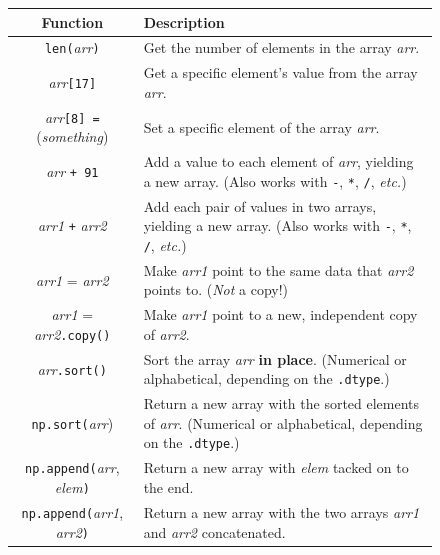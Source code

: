 \begin{figure}[ht]
\centering
\begin{tabular}{c|p{3.3in}}
Function & Description \\
\hline

\texttt{len(}\textsl{arr}\texttt{)} & Get the number of elements in the array \textsl{arr}. \\

\textsl{arr}\texttt{[17]} & Get a specific element's value from the array \textsl{arr}. \\

\textsl{arr}\texttt{[8] =} (\textsl{something}) & Set a specific element of the array \textsl{arr}. \\

\textsl{arr} \texttt{+ 91} & Add a value to each element of \textsl{arr},
yielding a new array. (Also works with \texttt{-}, \texttt{*}, \texttt{/},
\textit{etc.}) \\

\textsl{arr1} \texttt{+} \textsl{arr2} & Add each pair of values in two arrays,
yielding a new array. (Also works with \texttt{-}, \texttt{*}, \texttt{/},
\textit{etc.}) \\

\textsl{arr1} = \textsl{arr2} & Make \textsl{arr1} point to the same data that
\textsl{arr2} points to. (\textit{Not} a copy!)\\

\textsl{arr1} = \textsl{arr2}\texttt{.copy()} & Make \textsl{arr1} point to a
new, independent copy of \textsl{arr2}. \\

\textsl{arr}\texttt{.sort()} & Sort the array \textsl{arr} \textbf{in place}. (Numerical or
alphabetical, depending on the \texttt{.dtype}.) \\

\texttt{np.sort(}\textsl{arr}) & Return a new array with the sorted elements
of \textsl{arr}. (Numerical or alphabetical, depending on the \texttt{.dtype}.)
\\

\texttt{np.append(}\textsl{arr}, \textsl{elem}\texttt{)} &
    Return a new array with \textsl{elem} tacked on to the end. \\

\texttt{np.append(}\textsl{arr1}, \textsl{arr2}\texttt{)} &
    Return a new array with the two arrays \textsl{arr1} and \textsl{arr2} concatenated. \\


\end{tabular}
\end{figure}
